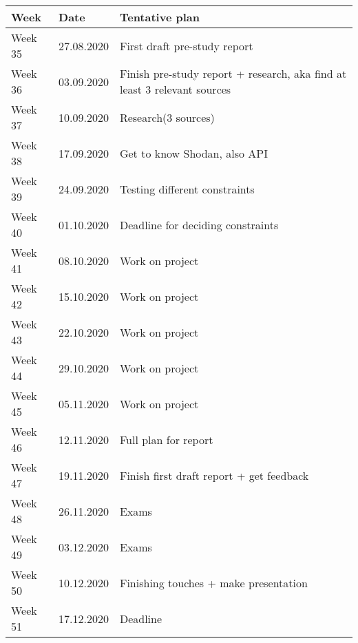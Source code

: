 \begin{tabular}{|l|l|l|}
\hline
Week & Date & Tentative plan                                                                     \\ \hline
Week 35 & 27.08.2020 & First draft pre-study report                                              \\ \hline
Week 36 & 03.09.2020 & Finish pre-study report + research, aka find at least 3 relevant sources  \\ \hline
Week 37 & 10.09.2020 & Research(3 sources)                                                       \\ \hline
Week 38 & 17.09.2020 & Get to know Shodan, also API                                              \\ \hline
Week 39 & 24.09.2020 & Testing different constraints                                             \\ \hline
Week 40 & 01.10.2020 & Deadline for deciding constraints                                         \\ \hline
Week 41 & 08.10.2020 & Work on project                                                           \\ \hline
Week 42 & 15.10.2020 & Work on project                                                           \\ \hline
Week 43 & 22.10.2020 & Work on project                                                           \\ \hline
Week 44 & 29.10.2020 & Work on project                                                           \\ \hline
Week 45 & 05.11.2020 & Work on project                                                           \\ \hline
Week 46 & 12.11.2020 & Full plan for report                                                      \\ \hline
Week 47 & 19.11.2020 & Finish first draft report + get feedback                                  \\ \hline
Week 48 & 26.11.2020 & Exams                                                                     \\ \hline
Week 49 & 03.12.2020 & Exams                                                                     \\ \hline
Week 50 & 10.12.2020 & Finishing touches + make presentation                                     \\ \hline
Week 51 & 17.12.2020 & Deadline                                                                  \\ \hline
\end{tabular}

